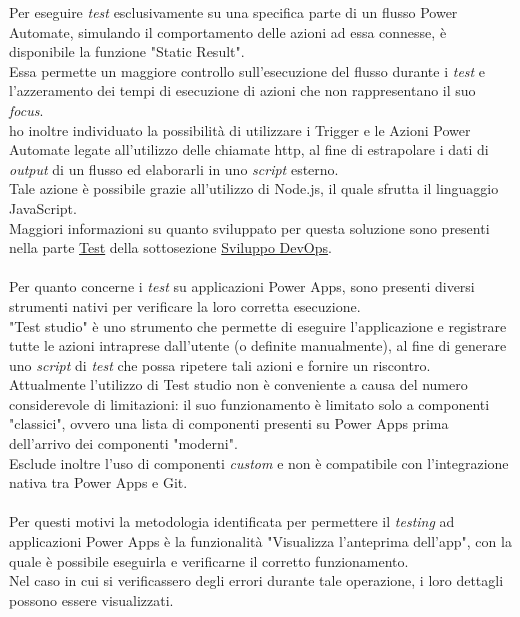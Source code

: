 \newpage \noindent Per eseguire \emph{test} esclusivamente su una specifica parte di un flusso Power Automate, simulando il comportamento delle azioni ad essa connesse, è disponibile la funzione "Static Result".\\
Essa permette un maggiore controllo sull'esecuzione del flusso durante i \emph{test} e l'azzeramento dei tempi di esecuzione di azioni che non rappresentano il suo \emph{focus}.\\
ho inoltre individuato la possibilità di utilizzare i Trigger e le Azioni Power Automate legate all'utilizzo delle chiamate \gls{http}, al fine di estrapolare i dati di \emph{output} di un flusso ed elaborarli in uno \emph{script} esterno.\\
Tale azione è possibile grazie all'utilizzo di Node.js, il quale sfrutta il linguaggio JavaScript.\\
Maggiori informazioni su quanto sviluppato per questa soluzione sono presenti nella parte \hyperref[testProgrammazione]{Test} della sottosezione \hyperref[Sviluppo DevOps]{Sviluppo DevOps}.\\\\
Per quanto concerne i \emph{test} su applicazioni Power Apps, sono presenti diversi strumenti nativi per verificare la loro corretta esecuzione.\\
"Test studio" è uno strumento che permette di eseguire l'applicazione e registrare tutte le azioni intraprese dall'utente (o definite manualmente), al fine di generare uno \emph{script} di \emph{test} che possa ripetere tali azioni e fornire un riscontro.\\
Attualmente l'utilizzo di Test studio non è conveniente a causa del numero considerevole di limitazioni:
il suo funzionamento è limitato solo a componenti "classici", ovvero una lista di componenti presenti su Power Apps prima dell'arrivo dei componenti "moderni".\\
Esclude inoltre l'uso di componenti \emph{custom} e non è compatibile con l'integrazione nativa tra Power Apps e Git.\\\\
Per questi motivi la metodologia identificata per permettere il \emph{testing} ad applicazioni Power Apps è la funzionalità "Visualizza l'anteprima dell'app", con la quale è possibile eseguirla e verificarne il corretto funzionamento.\\
Nel caso in cui si verificassero degli errori durante tale operazione, i loro dettagli possono essere visualizzati. 


